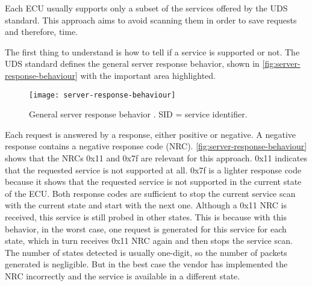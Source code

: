 Each ECU usually supports only a subset of the services offered  by the UDS standard. This approach aims to avoid scanning them in order to save requests and therefore, time.

The first thing to understand is how to tell if a service is supported or not. The UDS standard defines the general server response behavior, shown in \autoref{fig:server-response-behaviour} with the important area highlighted.

\begin{figure}[h]
    \centering
    \texttt{[image: server-response-behaviour]}
    \caption{General server response behavior \cite{iso14229}. SID = service identifier.}
    \label{fig:server-response-behaviour}
\end{figure}

Each request is answered by a response, either positive or negative. A negative response contains a negative response code (NRC). \autoref{fig:server-response-behaviour} shows that the NRCs 0x11 and 0x7f are relevant for this approach. 0x11 indicates that the requested service is not supported at all. 0x7f is a lighter response code because it shows that the requested service is not supported in the current state of the ECU. Both response codes are sufficient to stop the current service scan with the current state and start with the next one. Although a 0x11 NRC is received, this service is still probed in other states. This is because with this behavior, in the worst case, one request is generated for this service for each state, which in turn receives 0x11 NRC again and then stops the service scan. The number of states detected is usually one-digit, so the number of packets generated is negligible. But in the best case the vendor has implemented the NRC incorrectly and the service is available in a different state.
